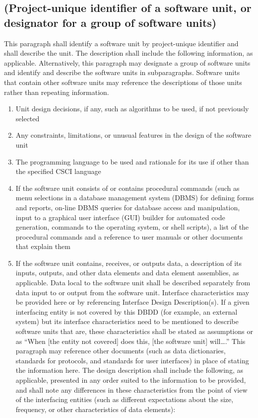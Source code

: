 \documentclass{fidata-report-template}
\begin{document}
\subsection{(Project-unique identifier of a software unit, or
designator for a group of software units)}

This paragraph shall identify a software unit by project-unique
identifier and shall describe the unit. The description shall include
the following information, as applicable. Alternatively, this paragraph
may designate a group of software units and identify and describe the
software units in subparagraphs. Software units that contain other
software units may reference the descriptions of those units rather than
repeating information.

\begin{enumerate}
\itemsep1pt\parskip0pt
\item
  Unit design decisions, if any, such as algorithms to be used, if not
  previously selected
\item
  Any constraints, limitations, or unusual features in the design of the
  software unit
\item
  The programming language to be used and rationale for its use if other
  than the specified CSCI language
\item
  If the software unit consists of or contains procedural commands (such
  as menu selections in a database management system (DBMS) for defining
  forms and reports, on-line DBMS queries for database access and
  manipulation, input to a graphical user interface (GUI) builder for
  automated code generation, commands to the operating system, or shell
  scripts), a list of the procedural commands and a reference to user
  manuals or other documents that explain them
\item
  If the software unit contains, receives, or outputs data, a
  description of its inputs, outputs, and other data elements and data
  element assemblies, as applicable. Data local to the software unit
  shall be described separately from data input to or output from the
  software unit. Interface characteristics may be provided here or by
  referencing Interface Design Description(s). If a given interfacing
  entity is not covered by this DBDD (for example, an external system)
  but its interface characteristics need to be mentioned to describe
  software units that are, these characteristics shall be stated as
  assumptions or as ``When {[}the entity not covered{]} does this,
  {[}the software unit{]} will\ldots{}.'' This paragraph may reference
  other documents (such as data dictionaries, standards for protocols,
  and standards for user interfaces) in place of stating the information
  here. The design description shall include the following, as
  applicable, presented in any order suited to the information to be
  provided, and shall note any differences in these characteristics from
  the point of view of the interfacing entities (such as different
  expectations about the size, frequency, or other characteristics of
  data elements):


\end{enumerate}
\end{document}

